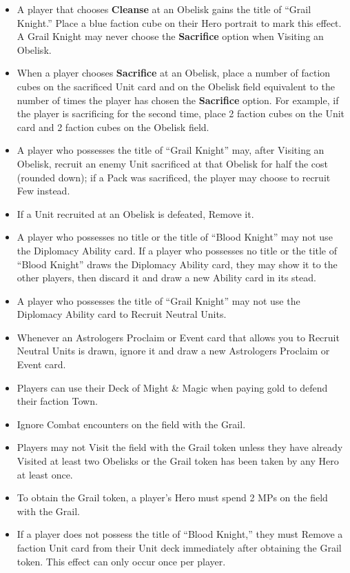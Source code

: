 \begin{multicols*}{2}
\begin{itemize}
  \item A player that chooses \textbf{Cleanse} at an Obelisk gains the title of ``\textcolor{cobalt}{Grail Knight}.'' Place a blue faction cube on their Hero portrait to mark this effect. A \textcolor{cobalt}{Grail Knight} may never choose the \textbf{Sacrifice} option when Visiting an Obelisk.
  \item When a player chooses \textbf{Sacrifice} at an Obelisk, place a number of faction cubes on the sacrificed Unit card and on the Obelisk field equivalent to the number of times the player has chosen the \textbf{Sacrifice} option. For example, if the player is sacrificing for the second time, place 2 faction cubes on the Unit card and 2 faction cubes on the Obelisk field.
  \item A player who possesses the title of ``\textcolor{cobalt}{Grail Knight}'' may, after Visiting an Obelisk, recruit an enemy Unit sacrificed at that Obelisk for half the cost (rounded down); if a Pack was sacrificed, the player may choose to recruit Few instead.
  \item If a Unit recruited at an Obelisk is defeated, Remove it.
  \item A player who possesses no title or the title of ``\textcolor{darkcandyapplered}{Blood Knight}'' may not use the Diplomacy Ability card. If a player who possesses no title or the title of ``\textcolor{darkcandyapplered}{Blood Knight}'' draws the Diplomacy Ability card, they may show it to the other players, then discard it and draw a new Ability card in its stead.
  \item A player who possesses the title of ``\textcolor{cobalt}{Grail Knight}'' may not use the Diplomacy Ability card to Recruit Neutral  Units.
  \item Whenever an Astrologers Proclaim or Event card that allows you to Recruit Neutral Units is drawn, ignore it and draw a new Astrologers Proclaim or Event card.
  \item Players can use their Deck of Might \& Magic when paying gold to defend their faction Town.
  \item Ignore Combat encounters on the field with the Grail.
  \item Players may not Visit the field with the Grail token unless they have already Visited at least two Obelisks or the Grail token has been taken by any Hero at least once.
  \item To obtain the Grail token, a player’s Hero must spend 2 MPs on the field with the Grail.
  \item If a player does not possess the title of ``\textcolor{darkcandyapplered}{Blood Knight},'' they must Remove a faction Unit card from their Unit deck immediately after obtaining the Grail token. This effect can only occur once per player.

\end{itemize}
\end{multicols*}
